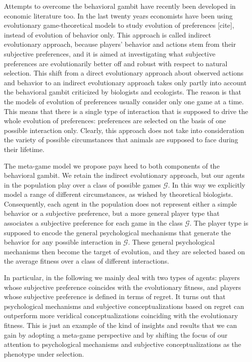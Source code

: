 \documentclass[fleqn,reqno,11pt]{article}
\begin{document}
Attempts to overcome the behavioral gambit have recently been developed in economic literature too. In the last twenty years economists have been using evolutionary game-theoretical models to study evolution of preferences [cite], instead of evolution of behavior only. This approach is called indirect evolutionary approach, because players' behavior and actions stem from their subjective preferences, and it is aimed at investigating what subjective preferences are evolutionarily better off and robust with respect to natural selection. This shift from a direct evolutionary approach about observed actions and behavior to an indirect evolutionary approach takes only partly into account the behavioral gambit criticized by biologists and ecologists. The reason is that the models of evolution of preferences usually consider only one game at a time. This means that there is a single type of interaction that is supposed to drive the whole evolution of preferences: preferences are selected on the basis of one possible interaction only. Clearly, this approach does not take into consideration the variety of possible circumstances that animals are supposed to face during their lifetime. 

The meta-game model we propose pays heed to both components of the behavioral gambit. We retain the indirect evolutionary approach, but our agents in the population play over a class of possible games $\mathcal{G}$. In this way we explicitly model a range of different circumstances, as wished by theoretical biologists.  Consequently, each agent in the population does not represent either a simple behavior or a subjective preference, but a more general player type that associates a subjective preference for each game in the class $\mathcal{G}$. The player type is supposed to encode the general psychological mechanisms that generate the behavior for any possible interaction in $\mathcal{G}$. These general psychological mechanisms then become the target of evolution, and they are selected based on the average fitness over a class of different interactions. 

In particular, in the following we mainly deal with two types of agents: players whose subjective preference coincides with the evolutionary fitness, and players whose subjective preference is defined in terms of regret. It turns out that psychological mechanisms and subjective conceptualizations based on regret can outperform more veridical conceptualizations coinciding with the evolutionary fitness.
This is just an example of the kind of insights and results that we can gain by adopting a meta-game perspective and by shifting the focus of our attention to psychological mechanisms and subjective conceptualizations as the phenotype under selection.
\end{document}
